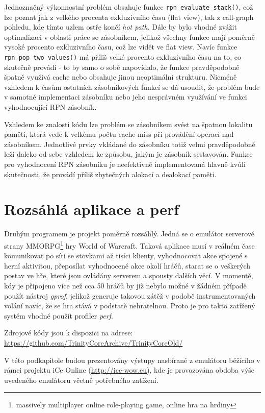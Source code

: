 \documentclass[czech,BP]{thesiskiv}
\begin{document}
Jednoznačný výkonnostní problém obsahuje funkce \texttt{rpn\_evaluate\_stack()}, což lze poznat jak z velkého procenta exkluzivního času (flat view), tak z call-graph pohledu, kde tímto uzlem ostře končí \emph{hot path}. Dále by bylo vhodné zvážit optimalizaci v oblasti práce se zásobníkem, jelikož všechny funkce mají poměrně vysoké procento exkluzivního času, což lze vidět ve flat view. Navíc funkce \texttt{rpn\_pop\_two\_values()} má příliš velké procento exkluzivního času na to, co skutečně provádí - to by samo o sobě napovídalo, že funkce pravděpodobně špatně využívá cache nebo obsahuje jinou neoptimální strukturu. Nicméně vzhledem k časům ostatních zásobníkových funkcí se dá usoudit, že problém bude v samotné implementaci zásobníku nebo jeho nesprávném využívání ve funkci vyhodnocující RPN zásobník.

Vzhledem ke znalosti kódu lze problém se zásobníkem svést na špatnou lokalitu paměti, která vede k velkému počtu cache-miss při provádění operací nad zásobníkem. Jednotlivé prvky vkládané do zásobníku totiž velmi pravděpodobně leží daleko od sebe vzhledem ke způsobu, jakým je zásobník sestavován. Funkce pro vyhodnocení RPN zásobníku je neefektivně implementovaná hlavně kvůli skutečnosti, že provádí příliš zbytečných alokací a dealokací paměti.


\section{Rozsáhlá aplikace a perf}

Druhým programem je projekt poměrně rozsáhlý. Jedná se o emulátor serverové strany MMORPG\footnote{massively multiplayer online role-playing game, online hra na hrdiny} hry World of Warcraft. Taková aplikace musí v reálném čase komunikovat po síti se stovkami až tisíci klienty, vyhodnocovat akce spojené s herní aktivitou, přeposílat vyhodnocené akce okolí hráčů, starat se o  veškerých postav ve hře, které jsou ovládány serverem a spousty dalších věcí. V momentě, kdy je připojeno více než cca 50 hráčů by již nebylo možné v žádném případě použít nástroj \emph{gprof}, jelikož generuje takovou zátěž v podobě instrumentovaných volání navíc, že se hra stává v podstatě nehratelnou. Proto je pro takto zatížený systém vhodné použít profiler \emph{perf}.

Zdrojové kódy jsou k dispozici na adrese:\\
\url{https://github.com/TrinityCoreArchive/TrinityCoreOld/}

V této podkapitole budou prezentovány výstupy nasbírané z emulátoru běžícího v rámci projektu iCe Online (\url{http://ice-wow.eu}), kde je provozována obdoba výše uvedeného emulátoru včetně potřebného zatížení.
\end{document}
